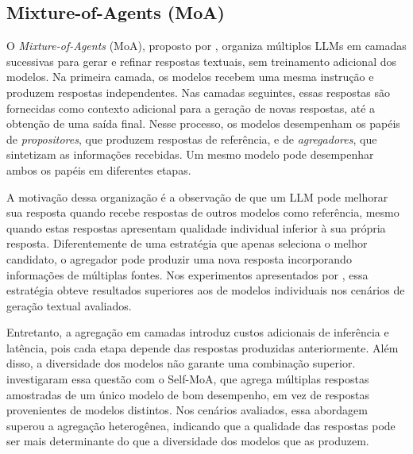 
\subsection{Mixture-of-Agents (MoA)}

O \textit{Mixture-of-Agents} (MoA), proposto por \citet{wang2024moa}, organiza múltiplos LLMs em camadas sucessivas para gerar e refinar respostas textuais, sem treinamento adicional dos modelos. Na primeira camada, os modelos recebem uma mesma instrução e produzem respostas independentes. Nas camadas seguintes, essas respostas são fornecidas como contexto adicional para a geração de novas respostas, até a obtenção de uma saída final. Nesse processo, os modelos desempenham os papéis de \textit{propositores}, que produzem respostas de referência, e de \textit{agregadores}, que sintetizam as informações recebidas. Um mesmo modelo pode desempenhar ambos os papéis em diferentes etapas.

A motivação dessa organização é a observação de que um LLM pode melhorar sua resposta quando recebe respostas de outros modelos como referência, mesmo quando estas respostas apresentam qualidade individual inferior à sua própria resposta. Diferentemente de uma estratégia que apenas seleciona o melhor candidato, o agregador pode produzir uma nova resposta incorporando informações de múltiplas fontes. Nos experimentos apresentados por \citet{wang2024moa}, essa estratégia obteve resultados superiores aos de modelos individuais nos cenários de geração textual avaliados.

Entretanto, a agregação em camadas introduz custos adicionais de inferência e latência, pois cada etapa depende das respostas produzidas anteriormente. Além disso, a diversidade dos modelos não garante uma combinação superior. \citet{li2025selfmoa} investigaram essa questão com o Self-MoA, que agrega múltiplas respostas amostradas de um único modelo de bom desempenho, em vez de respostas provenientes de modelos distintos. Nos cenários avaliados, essa abordagem superou a agregação heterogênea, indicando que a qualidade das respostas pode ser mais determinante do que a diversidade dos modelos que as produzem.

